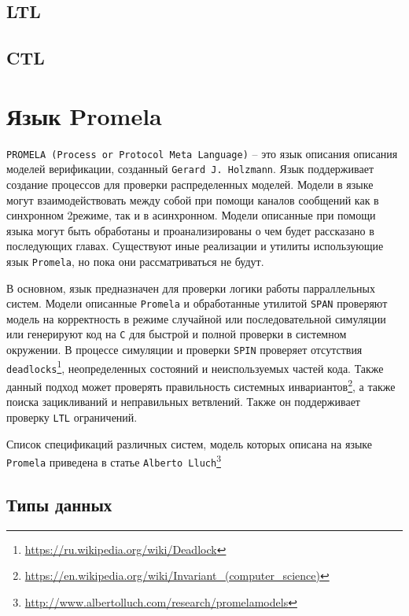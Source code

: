 \documentclass[12pt, twoside]{report}
\begin{document}
\subsection*{LTL}\label{temporal_logic_LTL}

\subsection*{CTL}\label{temporal_logic_CTL}

\section*{Язык Promela}\label{promela_LANGUAGE}
\texttt{PROMELA (Process or Protocol Meta Language)} -- это язык описания описания моделей верификации,
созданный \texttt{Gerard J. Holzmann}\cite{Promela:Wiki}. Язык поддерживает создание процессов
для проверки распределенных моделей. Модели в языке могут взаимодействовать между собой при помощи
каналов сообщений как в синхронном 2режиме, так и в асинхронном. Модели описанные при помощи языка
могут быть обработаны и проанализированы  о чем будет рассказано в последующих главах.
Существуют иные реализации и утилиты использующие язык \texttt{Promela}, но пока они рассматриваться не будут.

В основном, язык предназначен для проверки логики работы парраллельных систем. Модели описанные
\texttt{Promela} и обработанные утилитой \texttt{SPAN} проверяют модель на корректность в режиме случайной
или последовательной симуляции или генерируют код на \texttt{C} для быстрой и полной проверки в системном окружении.
В процессе симуляции и проверки \texttt{SPIN} проверяет отсутствия \texttt{deadlocks}\footnote{\url{https://ru.wikipedia.org/wiki/Deadlock}},
неопределенных состояний и неиспользуемых частей кода. Также данный подход может проверять правильность системных инвариантов\footnote{\url{https://en.wikipedia.org/wiki/Invariant_(computer_science)}},
а также поиска зацикливаний и неправильных ветвлений. Также он поддерживает проверку \texttt{LTL} ограничений.

Список спецификаций различных систем, модель которых описана на языке \texttt{Promela}
приведена в статье \texttt{Alberto Lluch}\footnote{\url{http://www.albertolluch.com/research/promelamodels}}
\subsection*{Типы данных}\label{promela_language_DATATYPES}
\end{document}
